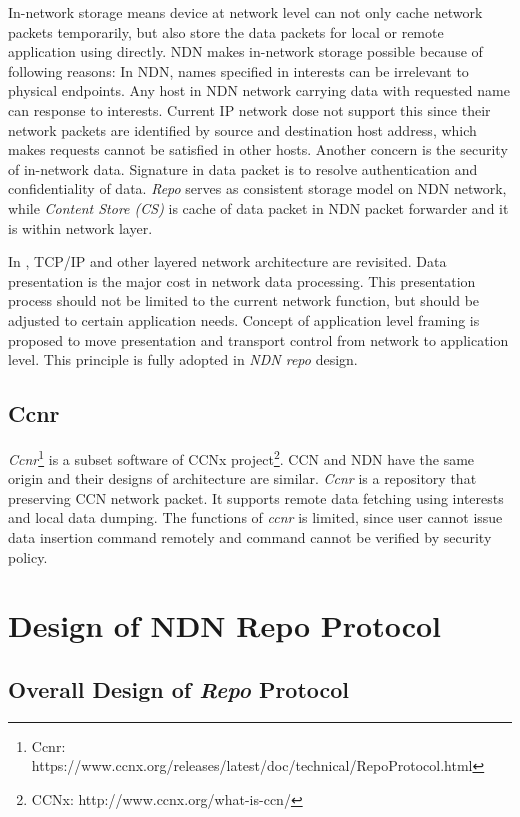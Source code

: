 \documentclass[conference]{IEEEtran}
\begin{document}
In-network storage means device at network level can not only cache network packets temporarily, but also store the data packets for local or remote application using directly. NDN makes in-network storage possible because of following reasons: In NDN, names specified in interests can be irrelevant to physical endpoints. Any host in NDN network carrying data with requested name can response to interests. Current IP network dose not support this since their network packets are identified by source and destination host address, which makes requests cannot be satisfied in other hosts. Another concern is the security of in-network data. Signature in data packet is to resolve authentication and confidentiality of data. \emph{Repo} serves as consistent storage model on NDN network, while \emph{Content Store (CS)} is cache of data packet in NDN packet forwarder and it is within network layer.

In \cite{clark1990architectural}, TCP/IP and other layered network architecture are revisited. Data presentation is the major cost in network data processing. This presentation process should not be limited to the current network function, but should be adjusted to certain application needs. Concept of application level framing is proposed to move presentation and transport control from network to application level. This principle is fully adopted in \emph{NDN repo} design.

\subsection{Ccnr}

\emph{Ccnr}\footnote{Ccnr: https://www.ccnx.org/releases/latest/doc/technical/RepoProtocol.html} is a subset software of CCNx project\footnote{CCNx: http://www.ccnx.org/what-is-ccn/}. CCN and NDN have the same origin and their designs of architecture are similar. \emph{Ccnr} is a repository that preserving CCN network packet. It supports remote data fetching using interests and local data dumping. The functions of \emph{ccnr} is limited, since user cannot issue data insertion command remotely and command cannot be verified by security policy.

\section{Design of NDN Repo Protocol} \label{section-design}

\subsection{Overall Design of \emph{Repo} Protocol}
\end{document}
